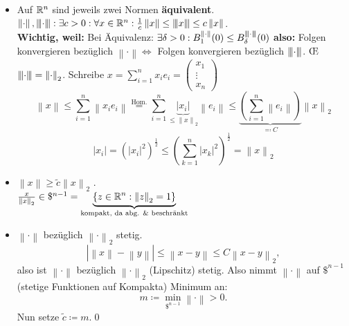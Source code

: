 \begin{itemize}
	\item Auf $ \mathbb{R} ^n $ sind jeweils zwei Normen \textbf{äquivalent}.\\
		$ \left\| \cdot  \right\|, {\left\vert\kern-0.25ex\left\vert\kern-0.25ex\left\vert  \cdot  \right\vert\kern-0.25ex\right\vert\kern-0.25ex\right\vert} : \exists c  > 0 : \forall x \in \mathbb{R} ^n : \frac{ 1 }{ c } \left\| x \right\| \leq {\left\vert\kern-0.25ex\left\vert\kern-0.25ex\left\vert x \right\vert\kern-0.25ex\right\vert\kern-0.25ex\right\vert} \leq c \left\| x \right\| $.\\
		\textbf{Wichtig, weil:} Bei Äquivalenz: $ \exists \delta > 0 : B_{1}^{\left\| \cdot  \right\| } (0) \leq B_{\delta}^{{\left\vert\kern-0.25ex\left\vert\kern-0.25ex\left\vert \cdot  \right\vert\kern-0.25ex\right\vert\kern-0.25ex\right\vert}} (0)   $ 
		\textbf{also:} Folgen konvergieren bezüglich $ \left\| \cdot  \right\| \iff  $ Folgen konvergieren bezüglich $ {\left\vert\kern-0.25ex\left\vert\kern-0.25ex\left\vert \cdot  \right\vert\kern-0.25ex\right\vert\kern-0.25ex\right\vert} $.
		\OE{} $ {\left\vert\kern-0.25ex\left\vert\kern-0.25ex\left\vert \cdot  \right\vert\kern-0.25ex\right\vert\kern-0.25ex\right\vert} = \left\| \cdot  \right\| _2 $.
		Schreibe $ x = \sum_{i=1}^{n} x_ie_i = \begin{pmatrix} x_1 \\ \vdots \\ x_n \end{pmatrix}  $
		\[
			\left\| x \right\| \leq \sum_{i=1}^{n} \left\| x_i e_i \right\| \overset{\text{Hom.} }{=} \sum_{i=1}^{n} \underbrace{\left| x_i \right| }_{\leq \left\| x \right\| _2}\left\| e_i \right\| \leq \underbrace{\left( \sum_{i=1}^{n} \left\| e_i \right\|  \right) }_{\eqcolon C} \left\| x \right\| _2
		\]
		\[
		 	\left| x_i \right| = \left( \left| x_i \right| ^2 \right) ^{\frac{ 1 }{ 2 } } \leq \left( \sum_{k=1}^{n} \left| x_k \right| ^2 \right) ^{\frac{ 1 }{ 2 } } = \left\| x \right\| _2
		 \]
	 \item $ \left\| x \right\| \geq \tilde c \left\| x \right\| _2 $ .\\
			 $ \frac{ x }{ \left\| x \right\| _2 } \in \mathdollar^{n-1} = \underbrace{\left\{ z \in \mathbb{R} ^n : \left\| z \right\| _2 = 1 \right\} }_{\text{kompakt, da abg. \& beschränkt} } $
		 \item $ \left\| \cdot  \right\|  $ bezüglich $ \left\| \cdot  \right\| _2 $ stetig.
			 \[
			 	\left| \left\| x \right\| - \left\| y \right\|  \right| \leq \left\| x - y \right\| \leq C \left\| x - y \right\| _2,
			 \]
			 also ist $ \left\| \cdot  \right\|  $ bezüglich $ \left\| \cdot  \right\| _2 $ (Lipschitz) stetig.
			 Also nimmt $ \left\| \cdot  \right\|  $ auf $ \mathdollar^{n - 1}  $ (stetige Funktionen auf Kompakta) Minimum an:
			 \[
			 	m \coloneqq \min_{\mathdollar^{n - 1} } \left\| \cdot  \right\| > 0.
			 \]
			 Nun setze $ \tilde c \coloneqq m $.\qed
\end{itemize}

